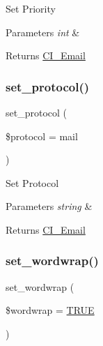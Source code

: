 Set Priority


\begin{DoxyParams}{Parameters}
{\em int} & \\
\hline
\end{DoxyParams}
\begin{DoxyReturn}{Returns}
\mbox{\hyperlink{class_c_i___email}{C\+I\+\_\+\+Email}} 
\end{DoxyReturn}
\mbox{\label{class_c_i___email_a7be40507898a21ce9172b225e973b107}} 
\subsubsection{\texorpdfstring{set\+\_\+protocol()}{set\_protocol()}}
{\footnotesize\ttfamily set\+\_\+protocol (\begin{DoxyParamCaption}\item[{}]{\$protocol = {\ttfamily \textquotesingle{}mail\textquotesingle{}} }\end{DoxyParamCaption})}

Set Protocol


\begin{DoxyParams}{Parameters}
{\em string} & \\
\hline
\end{DoxyParams}
\begin{DoxyReturn}{Returns}
\mbox{\hyperlink{class_c_i___email}{C\+I\+\_\+\+Email}} 
\end{DoxyReturn}
\mbox{\label{class_c_i___email_a6abb8d5f17213eba1e243ca633da8084}} 
\subsubsection{\texorpdfstring{set\+\_\+wordwrap()}{set\_wordwrap()}}
{\footnotesize\ttfamily set\+\_\+wordwrap (\begin{DoxyParamCaption}\item[{}]{\$wordwrap = {\ttfamily \mbox{\hyperlink{constants_8php_ae04a3efe6aa42044f803ee90c2277846}{T\+R\+UE}}} }\end{DoxyParamCaption})}

